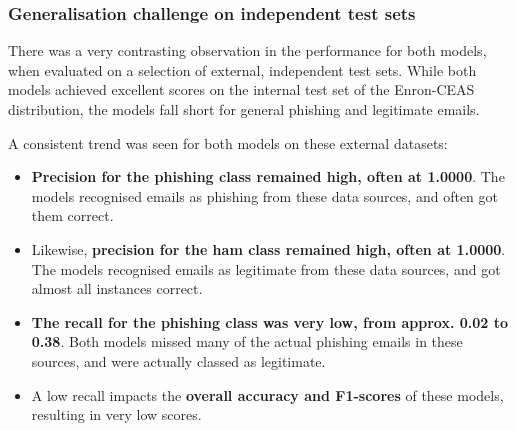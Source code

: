 
\subsubsection*{Generalisation challenge on independent test sets}
There was a very contrasting observation in the performance for both models, when evaluated on a selection of external, independent test sets. While both models achieved excellent scores on the internal test set of the Enron-CEAS distribution, the models fall short for general phishing and legitimate emails.\newline

\noindent A consistent trend was seen for both models on these external datasets:

\begin{itemize}
  \item \textbf{Precision for the phishing class remained high, often at 1.0000}. The models recognised emails as phishing from these data sources, and often got them correct.
  \item Likewise, \textbf{precision for the ham class remained high, often at 1.0000}. The models recognised emails as legitimate from these data sources, and got almost all instances correct.
  \item \textbf{The recall for the phishing class was very low, from approx. 0.02 to 0.38}. Both models missed many of the actual phishing emails in these sources, and were actually classed as legitimate.
  \item A low recall impacts the \textbf{overall accuracy and F1-scores} of these models, resulting in very low scores.
\end{itemize}
